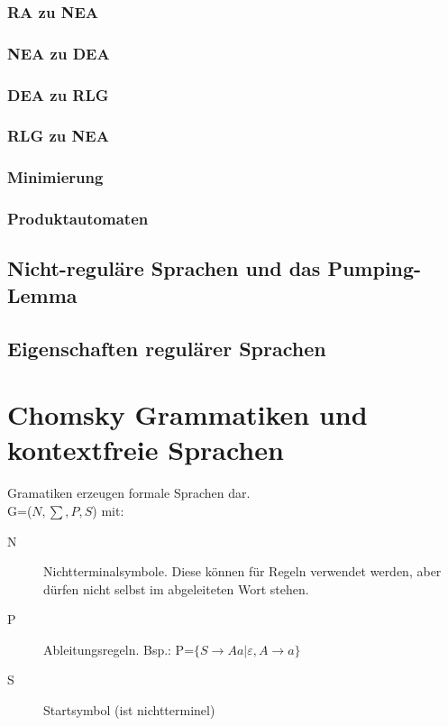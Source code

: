 \documentclass[12pt,a4paper]{article}
\begin{document}
\subsubsection{RA zu NEA}

\subsubsection{NEA zu DEA}

\subsubsection{DEA zu RLG}

\subsubsection{RLG zu NEA}

\subsubsection{Minimierung}

\subsubsection{Produktautomaten}

\subsection{Nicht-reguläre Sprachen und das Pumping-Lemma}

\subsection{Eigenschaften regulärer Sprachen}

\section{Chomsky Grammatiken und kontextfreie Sprachen}
	Gramatiken erzeugen formale Sprachen dar.\\
	G=($N, \sum , P, S$) mit:\\
	\begin{description}
		\item[N] Nichtterminalsymbole. Diese können für Regeln verwendet werden, aber dürfen nicht selbst im abgeleiteten Wort stehen.
		\item[P] Ableitungsregeln. Bsp.: P=$\{ S \rightarrow Aa | \varepsilon , A \rightarrow a \} $ 
		\item[S] Startsymbol (ist nichtterminel)
	\end{description}
\end{document}
